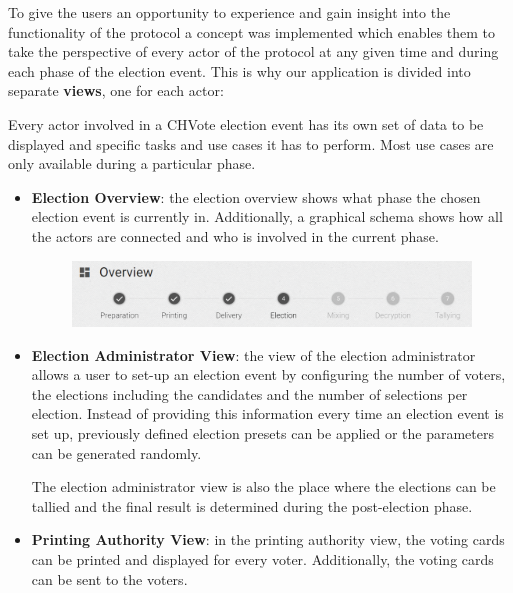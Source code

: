 To give the users an opportunity to experience and gain insight into the functionality of the protocol a concept was implemented which enables them to take the perspective of every actor of the protocol at any given time and during each phase of the election event. This is why our application is divided into separate \textbf{views}, one for each actor:

Every actor involved in a CHVote election event has its own set of data to be displayed and specific tasks and use cases it has to perform. Most use cases are only available during a particular phase.

\begin{itemize}
	\item \textbf{Election Overview}: the election overview shows what phase the chosen election event is currently in. Additionally, a graphical schema shows how all the actors are connected and who is involved in the current phase.
\begin{figure}
\begin{center}
\includegraphics[scale=0.50]{assets/screenshots/overview.PNG}
\label{Election Overview}%
\end{center}
\end{figure}

	\item \textbf{Election Administrator View}: the view of the election administrator allows a user to set-up an election event by configuring the number of voters, the elections including the candidates and the number of selections per election. Instead of providing this information every time an election event is set up, previously defined election presets can be applied or the parameters can be generated randomly.

The election administrator view is also the place where the elections can be tallied and the final result is determined during the post-election phase.
	\item \textbf{Printing Authority View}: in the printing authority view, the voting cards can be printed and displayed for every voter. Additionally, the voting cards can be sent to the voters.


\end{itemize}
